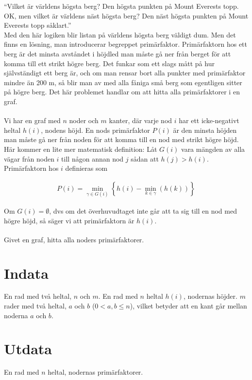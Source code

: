 
\def\version{1}

“Vilket är världens högsta berg? Den högsta punkten på Mount Everests topp. OK, men vilket är världens näst högsta berg? Den näst högsta punkten på Mount Everests topp såklart.”\\
Med den här logiken blir listan på världens högsta berg väldigt dum. Men det finns en lösning, man introducerar begreppet primärfaktor. Primärfaktorn hos ett berg är det minsta avståndet i höjdled man måste gå ner från berget för att komma till ett strikt högre berg. Det funkar som ett slags mått på hur självständigt ett berg är, och om man rensar bort alla punkter med primärfaktor mindre än 200 m, så blir man av med alla fåniga små berg som egentligen sitter på högre berg. Det här problemet handlar om att hitta alla primärfaktorer i en graf.
\\\\
Vi har en graf med $n$ noder och $m$ kanter, där varje nod $i$ har ett icke-negativt heltal $h(i)$, nodens höjd. En nods primärfaktor $P(i)$ är den minsta höjden man måste gå ner från noden för att komma till en nod med strikt högre höjd. Här kommer en lite mer matematisk definition:
Låt $G(i)$ vara mängden av alla vägar från noden $i$ till någon annan nod $j$ sådan att $h(j) > h(i)$. Primärfaktorn hos $i$ definieras som 

\begin{align*} 
P(i) =  \min_{\gamma \in G(i)}  \left\{   h(i) - \min_{k\in \gamma}(h(k))  \right\}
\end{align*} 

Om $G(i) = \emptyset$, dvs om det överhuvudtaget inte går att ta sig till en nod med högre höjd, så säger vi att primärfaktorn är $h(i)$. \\\\
Givet en graf, hitta alla noders primärfaktorer.

\section*{Indata}
En rad med två heltal, $n$ och $m$. En rad med $n$ heltal $h(i)$, nodernas höjder. $m$ rader med två heltal, $a$ och $b$ ($0 < a,b \leq n$), vilket betyder att en kant går mellan noderna $a$ och $b$.

\section*{Utdata}
En rad med $n$ heltal, nodernas primärfaktorer.

